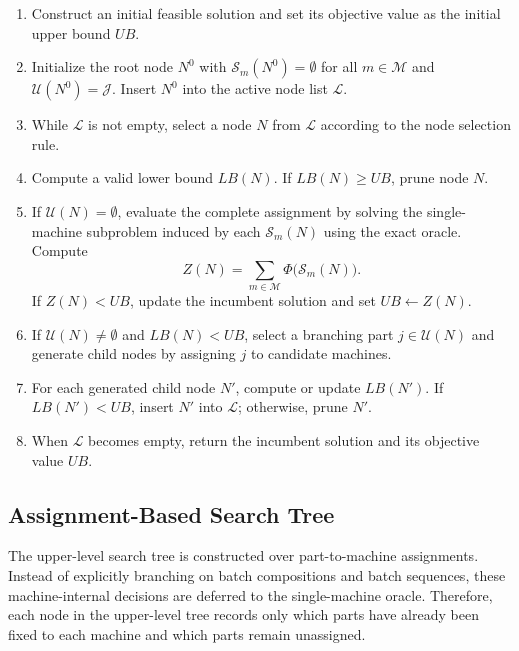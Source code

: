\documentclass[letterpaper, 10 pt, conference]{ieeeconf}  %
\begin{document}
\begin{enumerate}
	\item Construct an initial feasible solution and set its objective value
	as the initial upper bound $UB$.
	
	\item Initialize the root node $N^0$ with
	$\mathcal{S}_m(N^0)=\emptyset$ for all $m\in\mathcal{M}$ and
	$\mathcal{U}(N^0)=\mathcal{J}$. Insert $N^0$ into the active node list
	$\mathcal{L}$.
	
	\item While $\mathcal{L}$ is not empty, select a node $N$ from
	$\mathcal{L}$ according to the node selection rule.
	
	\item Compute a valid lower bound $LB(N)$. If $LB(N)\ge UB$, prune
	node $N$.
	
	\item If $\mathcal{U}(N)=\emptyset$, evaluate the complete assignment by
	solving the single-machine subproblem induced by each
	$\mathcal{S}_m(N)$ using the exact oracle. Compute
	\[
	Z(N)=\sum_{m\in\mathcal{M}}\Phi\bigl(\mathcal{S}_m(N)\bigr).
	\]
	If $Z(N)<UB$, update the incumbent solution and set $UB\leftarrow Z(N)$.
	
	\item If $\mathcal{U}(N)\neq\emptyset$ and $LB(N)<UB$, select a
	branching part $j\in\mathcal{U}(N)$ and generate child nodes by assigning
	$j$ to candidate machines.
	
	\item For each generated child node $N'$, compute or update $LB(N')$.
	If $LB(N')<UB$, insert $N'$ into $\mathcal{L}$; otherwise, prune $N'$.
	
	\item When $\mathcal{L}$ becomes empty, return the incumbent solution
	and its objective value $UB$.
\end{enumerate}




\subsection{Assignment-Based Search Tree}
\label{subsec:assignment_tree}

The upper-level search tree is constructed over part-to-machine assignments.
Instead of explicitly branching on batch compositions and batch sequences,
these machine-internal decisions are deferred to the single-machine oracle.
Therefore, each node in the upper-level tree records only which parts have
already been fixed to each machine and which parts remain unassigned.
\end{document}
